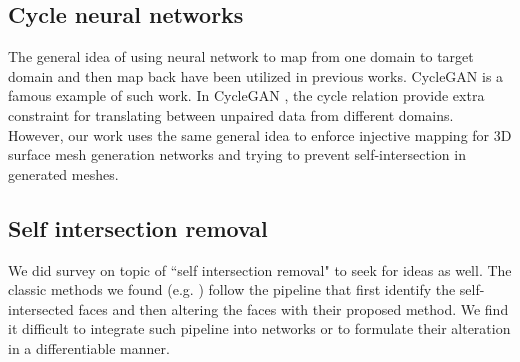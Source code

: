 \subsection{Cycle neural networks}
The general idea of using neural network to map from one domain to target domain and then map back have been utilized in previous works. CycleGAN \cite{CycleGAN2017} is a famous example of such work. In CycleGAN \cite{CycleGAN2017}, the cycle relation provide extra constraint for translating between unpaired data from different domains. However, our work uses the same general idea to enforce injective mapping for 3D surface mesh generation networks and trying to prevent self-intersection in generated meshes. 

\subsection{Self intersection removal}
We did survey on topic of ``self intersection removal" to seek for ideas as well. The classic methods we found (e.g. \cite{edgeswap,removeoffset}) follow the pipeline that first identify the self-intersected faces and then altering the faces with their proposed method. We find it difficult to integrate such pipeline into networks or to formulate their alteration in a differentiable manner. 
